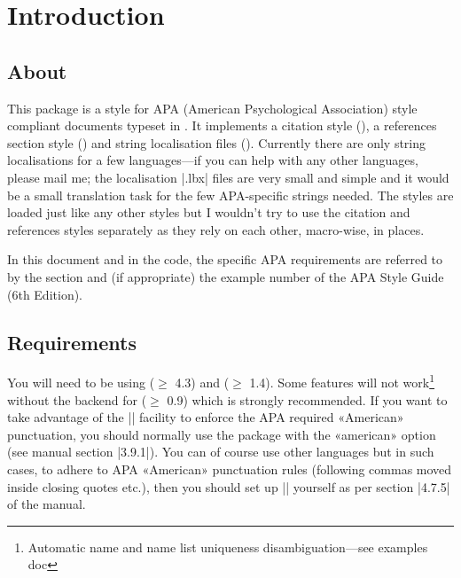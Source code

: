 \documentclass{ltxdockit}
\begin{document}
\printtitlepage
\tableofcontents

\section{Introduction}
\label{int}

\subsection{About}

This package is a  style for APA (American Psychological
Association) style compliant documents typeset in \latex. It implements a
citation style (), a references section style
() and string localisation files ().
Currently there are only string localisations for a few languages---if you can help with any other languages, please mail me; the
localisation |.lbx| files are very small and simple and it would be a small
translation task for the few APA-specific strings needed.
The styles are loaded just like any other  styles but I
wouldn't try to use the citation and references styles separately as they
rely on each other, macro-wise, in places.

In this document and in the code, the specific APA requirements are
referred to by the section and (if appropriate) the example number of the
APA Style Guide (6th Edition).

\subsection{Requirements}\label{ref:req}

You will need to be using  ($\geq$ 4.3) and 
($\geq$ 1.4). Some features will not work\footnote{Automatic name and name
  list uniqueness disambiguation---see examples doc} without the
 backend for  ($\geq$ 0.9) which is strongly
recommended. If you want to take advantage of the 
|\DeclareQuotePunctuation| facility to enforce the APA required «American»
punctuation, you should normally use the  package with the
«american» option (see  manual section |3.9.1|). You can of
course use other languages but in such cases, to adhere to APA «American»
punctuation rules (following commas moved inside closing quotes etc.), then
you should set up |\DeclareQuotePunctuation| yourself as per section
|4.7.5| of the  manual.
\end{document}
